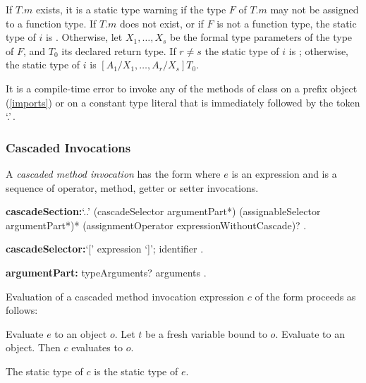 \documentclass{article}
\begin{document}
\LMHash{}
If $T.m$ exists, it is a static type warning if the type $F$ of $T.m$ may not be assigned to a function type.
If $T.m$ does not exist, or if $F$ is not a function type, the static type of $i$ is \DYNAMIC{}.
Otherwise, let $X_1, \ldots, X_s$ be the formal type parameters of the type of $F$,
and $T_0$ its declared return type.
If $r \not= s$ the static type of $i$ is \DYNAMIC{};
otherwise, the static type of $i$ is $[A_1/X_1, \ldots, A_r/X_s]T_0$.


\LMHash{}
It is a compile-time error to invoke any of the methods of class  on a prefix object (\ref{imports}) or on a constant type literal that is immediately followed by the token `.'\,.


\subsubsection{Cascaded Invocations}

\LMHash{}
A {\em cascaded method invocation} has the form 
where $e$ is an expression and  is a sequence of operator, method, getter or setter invocations.

\begin{grammar}
{\bf cascadeSection:}`{\escapegrammar ..}' (cascadeSelector argumentPart*)
  \gnewline{} (assignableSelector argumentPart*)*
  \gnewline{} (assignmentOperator expressionWithoutCascade)?
  .

{\bf cascadeSelector:}`[' expression `]';
  identifier
  .

{\bf argumentPart:}
  typeArguments? arguments
  .
\end{grammar}

\LMHash{}
Evaluation of a cascaded method invocation expression $c$ of the form  proceeds as follows:

Evaluate $e$ to an object $o$.
Let $t$ be a fresh variable bound to $o$.
Evaluate  to an object.
Then $c$ evaluates to $o$.

\LMHash{}
The static type of $c$ is the static type of $e$.

\end{document}

